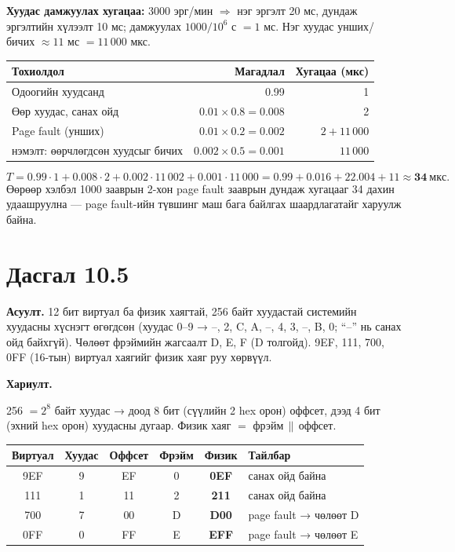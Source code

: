 \documentclass[12pt,a4paper]{article}
\newcommand{\question}[2]{\section{Дасгал #1}\textbf{Асуулт.} #2\par\medskip\textbf{Хариулт.}\par}
\begin{document}
\textbf{Хуудас дамжуулах хугацаа:} 3000 эрг/мин $\Rightarrow$ нэг эргэлт 20 мс, дундаж эргэлтийн хүлээлт 10 мс; дамжуулах $1000 / 10^6$ с $= 1$ мс. Нэг хуудас унших/бичих $\approx 11$ мс $= 11\,000$ мкс.

\begin{center}
\begin{tabular}{lrr}
\toprule
Тохиолдол & Магадлал & Хугацаа (мкс)\\
\midrule
Одоогийн хуудсанд & 0.99 & 1\\
Өөр хуудас, санах ойд & $0.01 \times 0.8 = 0.008$ & 2\\
Page fault (унших) & $0.01 \times 0.2 = 0.002$ & $2 + 11\,000$\\
\quad нэмэлт: өөрчлөгдсөн хуудсыг бичих & $0.002 \times 0.5 = 0.001$ & $11\,000$\\
\bottomrule
\end{tabular}
\end{center}
\[
T = 0.99 \cdot 1 + 0.008 \cdot 2 + 0.002 \cdot 11\,002 + 0.001 \cdot 11\,000 = 0.99 + 0.016 + 22.004 + 11 \approx \mathbf{34\ мкс}.
\]
Өөрөөр хэлбэл 1000 зааврын 2-хон page fault зааврын дундаж хугацааг 34 дахин удаашруулна — page fault-ийн түвшинг маш бага байлгах шаардлагатайг харуулж байна.

\question{10.5}{12 бит виртуал ба физик хаягтай, 256 байт хуудастай системийн хуудасны хүснэгт өгөгдсөн (хуудас 0–9 → –, 2, C, A, –, 4, 3, –, B, 0; “–” нь санах ойд байхгүй). Чөлөөт фрэймийн жагсаалт D, E, F (D толгойд). 9EF, 111, 700, 0FF (16-тын) виртуал хаягийг физик хаяг руу хөрвүүл.}

256 $= 2^8$ байт хуудас → доод 8 бит (сүүлийн 2 hex орон) оффсет, дээд 4 бит (эхний hex орон) хуудасны дугаар. Физик хаяг $=$ фрэйм$\,\|\,$оффсет.
\begin{center}
\begin{tabular}{cccccl}
\toprule
Виртуал & Хуудас & Оффсет & Фрэйм & Физик & Тайлбар\\
\midrule
9EF & 9 & EF & 0 & \textbf{0EF} & санах ойд байна\\
111 & 1 & 11 & 2 & \textbf{211} & санах ойд байна\\
700 & 7 & 00 & D & \textbf{D00} & page fault → чөлөөт D\\
0FF & 0 & FF & E & \textbf{EFF} & page fault → чөлөөт E\\
\bottomrule
\end{tabular}
\end{center}
\end{document}
